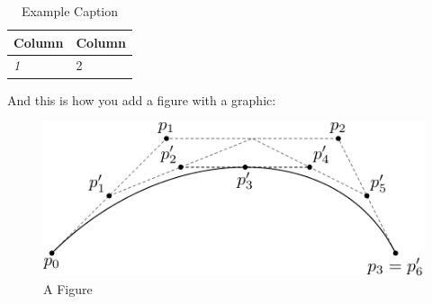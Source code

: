 \documentclass[12pt,twoside]{reedthesis}
\begin{document}
   \begin{table}[htbp] 
   	
   	\caption[Example]{Example Caption}  %
   	
   	\begin{center}  %
   		\begin{tabular}{l l}  %
   			\toprule %
   			Column &  Column \\ %
   			\midrule %
   			\textit{1} 				& 	2	 \\ %
   			\bottomrule %
   		\end{tabular}
   	\end{center}
   	\label{Example} %
   \end{table}
   
   
	
	And this is how you add a figure with a graphic:
	\begin{figure}[h]
	   
	       \centering
	    \includegraphics{subdivision}
	     \caption{A Figure}
	 \label{subd}
	\end{figure}
\end{document}
